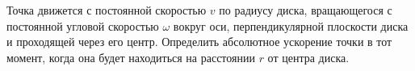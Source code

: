 Точка движется с постоянной скоростью $v$ по радиусу диска,
вращающегося с постоянной угловой скоростью $\omega$ вокруг оси,
перпендикулярной плоскости диска и проходящей через его центр.
Определить абсолютное ускорение точки в тот момент, когда она будет
находиться на расстоянии $r$ от центра диска.
